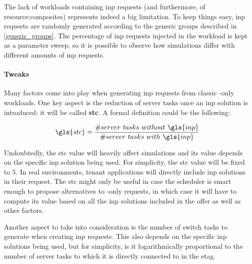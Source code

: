 The lack of workloads containing \gls{inp} requests (and furthermore, of \glspl{resource:composite}) represents indeed a big limitation.
To keep things easy, \gls{inp} requests are randomly generated according to the generic groups described in \autoref{generic_groups}.
The percentage of \gls{inp} requests injected in the workload is kept as a parameter sweep, so it is possible to observe how simulations differ with different amounts of \gls{inp} requests.

\paragraph{Tweaks} \label{workload_tweaks}
Many factors come into play when generating \gls{inp} requests from classic -only workloads.
One key aspect is the reduction of server tasks once an \gls{inp} solution is introduced: it will be called \textbf{\gls{stc}}.
A formal definition could be the following:

\begin{equation}
\label{stc_formula}
\gls{stc}=\dfrac{\#server\ tasks\ without\ \gls{inp}}{\#server\ tasks\ with\ \gls{inp}}
\end{equation}

Undoubtedly, the \gls{stc} value will heavily affect simulations and its value depends on the specific \gls{inp} solution being used.
For simplicity, the \gls{stc} value will be fixed to $5$. %
In real environments, tenant applications will directly include \gls{inp} solutions in their request.
The \gls{stc} might only be useful in case the scheduler is smart enough to propose alternatives to -only requests, in which case it will have to compute its value based on all the \gls{inp} solutions included in the offer as well as other factors.

Another aspect to take into consideration is the number of switch tasks to generate when creating \gls{inp} requests.
This also depends on the specific \gls{inp} solutions being used, but for simplicity, is it logarithmically proportional to the number of server tasks to which it is directly connected to in the \gls{etag}. %

